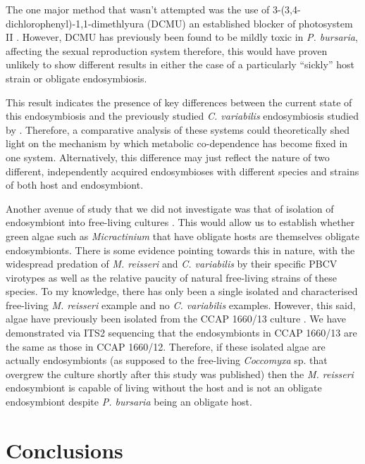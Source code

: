 The one major method that wasn't attempted was the use of 3-(3,4-dichlorophenyl)-1,1-dimethlyura (DCMU)
an established blocker of photosystem II \citep{VanGorkom1974}. 
However, DCMU has previously been found to be mildly toxic in \textit{P. bursaria}, 
affecting the sexual reproduction system \citep{Miwa2009} therefore, this would
have proven unlikely to show different results in either the case of a particularly 
``sickly'' host strain or obligate endosymbiosis. 


This result indicates the presence of key differences between the current state of this
endosymbiosis and the previously studied \textit{C. variabilis} endosymbiosis
studied by \citep{Kodama2014c}.  Therefore, a comparative analysis of these systems
could theoretically shed light on the mechanism by which metabolic co-dependence
has become fixed in one system. Alternatively, this difference may just reflect the nature of two
different, independently acquired endosymbioses with different species and strains
of both host and endosymbiont. 


Another avenue of study that we did not investigate was that of
isolation of endosymbiont into free-living cultures \citep{Achilles-Day2013a}. This would allow
us to establish whether green algae such as \textit{Micractinium} that have obligate
hosts are themselves obligate endosymbionts.  There is some evidence pointing
towards this in nature, with the widespread predation of \textit{M. reisseri}
and \textit{C. variabilis} by their specific PBCV virotypes as well as the relative
paucity of natural free-living strains of these species.  To my knowledge, there
has only been a single isolated and characterised free-living \textit{M. reisseri} \citep{Abou-Shanab2014}
example and no \textit{C. variabilis} examples.  However,
this said, algae have previously been isolated from the CCAP 1660/13 culture \citep{Achilles-Day2013a}.
We have demonstrated via ITS2 sequencing that the endosymbionts in CCAP 1660/13 are the same
as those in CCAP 1660/12. Therefore, if these isolated algae are actually endosymbionts (as supposed
to the free-living \textit{Coccomyxa} sp. that overgrew the culture shortly after this study
was published) then the \textit{M. reisseri} endosymbiont is capable of living without
the host and is not an obligate endosymbiont despite \textit{P. bursaria} being an obligate host.  

\section{Conclusions}

